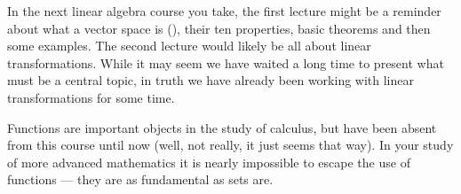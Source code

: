 In the next linear algebra course you take, the first lecture might be a reminder about what a vector space is (), their ten properties, basic theorems and then some examples.  The second lecture would likely be all about linear transformations.  While it may seem we have waited a long time to present what must be a central topic, in truth we have already been working with linear transformations for some time.\par
%
Functions are important objects in the study of calculus, but have been absent from this course until now (well, not really, it just seems that way).  In your study of more advanced mathematics it is nearly impossible to escape the use of functions --- they are as fundamental as sets are.

